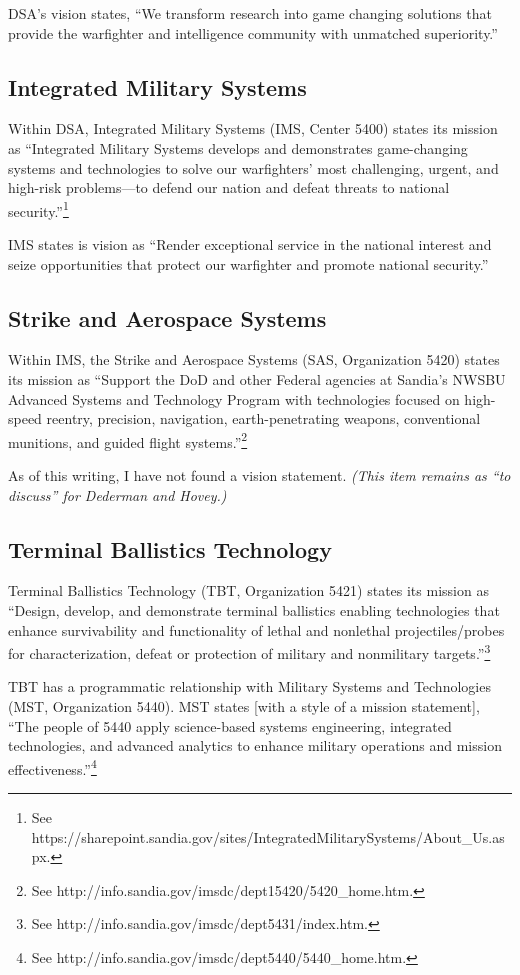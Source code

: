 \documentclass[12pt,reqno]{amsart}
\begin{document}
DSA's vision states, ``We transform research into game changing solutions 
that provide the warfighter and intelligence community with unmatched 
superiority.''

\subsection{Integrated Military Systems}
Within DSA, Integrated Military Systems (IMS, Center 5400) states its 
mission as ``Integrated Military Systems develops and demonstrates 
game-changing systems and technologies to solve our warfighters' most 
challenging, urgent, and high-risk problems---to defend our nation and defeat 
threats to national 
security.''\footnote{See https://sharepoint.sandia.gov/sites/IntegratedMilitarySystems/About\_Us.aspx.}

IMS states is vision as ``Render exceptional service in the national 
interest and seize opportunities that protect our warfighter and promote 
national security.''

\subsection{Strike and Aerospace Systems}
Within IMS, the Strike and Aerospace Systems (SAS, Organization 5420) states 
its mission as ``Support the DoD and other Federal agencies at 
Sandia's NWSBU Advanced Systems and Technology Program with technologies 
focused on high-speed reentry, precision, navigation, earth-penetrating 
weapons, conventional munitions, and guided flight 
systems.''\footnote{See http://info.sandia.gov/imsdc/dept15420/5420\_home.htm.}

As of this writing, I have not found a vision statement.  
{\em 
(This item remains as ``to discuss'' for Dederman and Hovey.)
}

\subsection{Terminal Ballistics Technology}
Terminal Ballistics Technology (TBT, Organization 5421) states its mission 
as ``Design, develop, and demonstrate terminal ballistics enabling 
technologies that enhance survivability and functionality of lethal and 
nonlethal projectiles/probes for characterization, defeat or protection of 
military and nonmilitary 
targets.''\footnote{See http://info.sandia.gov/imsdc/dept5431/index.htm.}

TBT has a programmatic relationship with Military Systems and Technologies 
(MST, Organization 5440).  MST states 
[with a style of a mission statement], 
``The people of 5440 apply science-based 
systems engineering, integrated technologies, and advanced analytics to 
enhance military operations and mission 
effectiveness.''\footnote{See http://info.sandia.gov/imsdc/dept5440/5440\_home.htm.}
					
\end{document}
